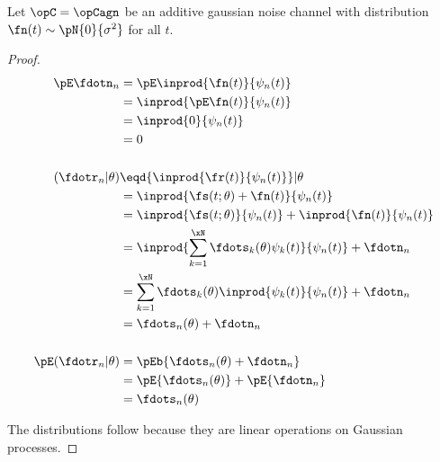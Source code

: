 \begin{theorem}%
\label{thm:agn_stats}
Let $\opC=\opCagn$ be an additive gaussian noise channel
with distribution $\fn(t)\sim\pN{0}{\sigma^2}$ for all $t$.
\end{theorem}
\begin{proof}
\begin{align*}
   \pE\fdotn_{n}
     &= \pE\inprod{\fn(t)}{\psi_n(t)}
   \\&= \inprod{\pE\fn(t)}{\psi_n(t)}
   \\&= \inprod{0}{\psi_n(t)}
   \\&= 0
\\
\\
   (\fdotr_n |\theta)
     &\eqd {\inprod{\fr(t)}{\psi_n(t)}}  |\theta
   \\&=    {\inprod{\fs(t;\theta)+\fn(t)}{\psi_n(t)}}
   \\&=    {\inprod{\fs(t;\theta)}{\psi_n(t)}} +   {\inprod{\fn(t)}{\psi_n(t)}}
   \\&=    \inprod{\sum_{k=1}^\xN \fdots_k(\theta) \psi_k(t)}{\psi_n(t)} + \fdotn_n
   \\&=    \sum_{k=1}^\xN \fdots_k(\theta) \inprod{\psi_k(t)}{\psi_n(t)} + \fdotn_n
   \\&=    \fdots_n(\theta)  + \fdotn_n
\\ \\
   \pE({\fdotr_n} | \theta)
     &= \pEb{\fdots_n(\theta)  + \fdotn_n}
   \\&= \pE{\fdots_n(\theta) } +   \pE{\fdotn_n}
   \\&= \fdots_n(\theta)
\end{align*}

The distributions follow because they are linear operations on
Gaussian processes.
\end{proof}




